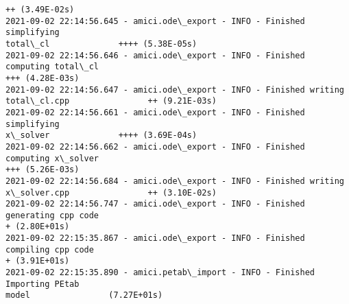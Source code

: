 \documentclass[11pt]{article}
\begin{document}
\begin{Verbatim}[commandchars=\\\{\}]
++ (3.49E-02s)
2021-09-02 22:14:56.645 - amici.ode\_export - INFO - Finished simplifying
total\_cl              ++++ (5.38E-05s)
2021-09-02 22:14:56.646 - amici.ode\_export - INFO - Finished computing total\_cl
+++ (4.28E-03s)
2021-09-02 22:14:56.647 - amici.ode\_export - INFO - Finished writing
total\_cl.cpp                ++ (9.21E-03s)
2021-09-02 22:14:56.661 - amici.ode\_export - INFO - Finished simplifying
x\_solver              ++++ (3.69E-04s)
2021-09-02 22:14:56.662 - amici.ode\_export - INFO - Finished computing x\_solver
+++ (5.26E-03s)
2021-09-02 22:14:56.684 - amici.ode\_export - INFO - Finished writing
x\_solver.cpp                ++ (3.10E-02s)
2021-09-02 22:14:56.747 - amici.ode\_export - INFO - Finished generating cpp code
+ (2.80E+01s)
2021-09-02 22:15:35.867 - amici.ode\_export - INFO - Finished compiling cpp code
+ (3.91E+01s)
2021-09-02 22:15:35.890 - amici.petab\_import - INFO - Finished Importing PEtab
model                (7.27E+01s)
    \end{Verbatim}
\end{document}
